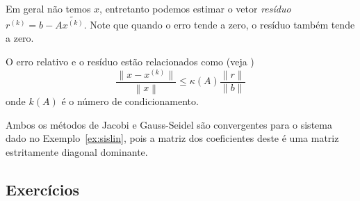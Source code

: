 Em geral não temos $x$, entretanto podemos estimar o vetor \emph{resíduo} $r^{(k)}=b-A\tilde{x^{(k)}}$. Note que quando o erro tende a zero, o resíduo também tende a zero.

\begin{teo}
 O erro relativo e o resíduo estão relacionados como (veja \cite{Burden2013})
\begin{equation*}
  \frac{ \|x-x^{(k)}\|}{\left\|x\right\|} \leq  \kappa(A) \frac{\|r\|}{\|b\|}
\end{equation*}
onde $k(A)$ é o número de condicionamento.
\end{teo}

\begin{ex}
  Ambos os métodos de Jacobi e Gauss-Seidel são convergentes para o sistema dado no Exemplo~\ref{ex:sislin}, pois a matriz dos coeficientes deste é uma matriz estritamente diagonal dominante.
\end{ex}

\subsection*{Exercícios}

